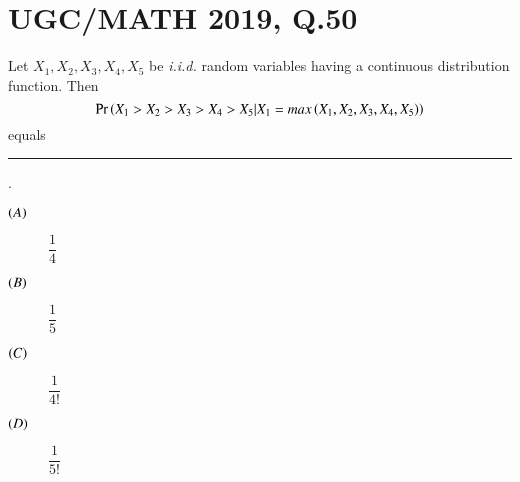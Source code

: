 \documentclass[journal,12pt,twocolumn]{IEEEtran}
\begin{document}
\section*{UGC/MATH 2019, Q.50}
\question Let $X_1, X_2, X_3, X_4, X_5$ be \textit{i.i.d.} random variables having a continuous distribution function. 
Then 
\begin{equation*}
    \Pr\left(X_1 > X_2 > X_3 > X_4 > X_5 | X_1 = max\left(X_1, X_2, X_3, X_4, X_5\right)\right)
\end{equation*}
equals \rule{1cm}{0.2mm}.
\begin{description}
\item[$\left(A\right)$]$\dfrac{1}{4}$ \\
\item[$\left(B\right)$]$\dfrac{1}{5}$  \\
\item[$\left(C\right)$]$\dfrac{1}{4!}$  \\
\item[$\left(D\right)$]$\dfrac{1}{5!}$  \\
\end{description}
\end{document}
